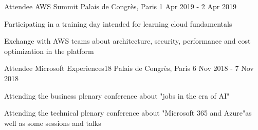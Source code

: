 \begin{cventries}

 \cventry
    {Attendee} %
    {AWS Summit} %
    {Palais de Congrès, Paris} %
    {1 Apr 2019 - 2 Apr 2019} %
    {
      \begin{cvitems} %
        \item {Participating in a training day intended for learning cloud fundamentals  }
        \item {Exchange with AWS teams about architecture, security, performance and cost optimization in the platform }
      \end{cvitems}
    }

 \cventry
    {Attendee} %
    {Microsoft Experiences18} %
    {Palais de Congrès, Paris} %
    {6 Nov 2018 - 7 Nov 2018} %
    {
      \begin{cvitems} %
        \item {Attending the business plenary conference about "jobs in the era of AI"}
        \item {Attending the technical plenary conference about "Microsoft 365 and Azure"as well as some sessions and talks}
      \end{cvitems}
    }

\end{cventries}
